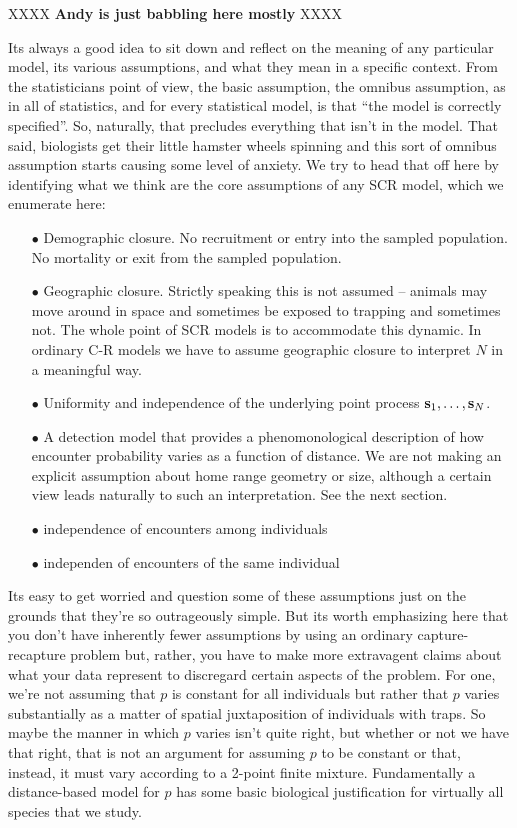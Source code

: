 XXXX {\bf Andy is just babbling here mostly} XXXX

Its always a good idea to sit down and reflect on the meaning of any
particular model, its various assumptions, and what they mean in a
specific context. 
From the statisticians point of view, 
the basic assumption, the omnibus assumption, as in all of statistics, and for every
statistical model, is  that ``the model is
correctly specified''. So, naturally, that precludes everything that
isn't in the model. That said, biologists get their little hamster
wheels spinning and this sort of omnibus assumption starts causing
some level of anxiety. We try to head that off here by identifying
what we think are the core assumptions of any SCR model, which we
enumerate here:

\begin{itemize} 
\item[$\bullet$] Demographic closure. 
 No recruitment or entry into the sampled population.
 No mortality or exit from the sampled population.
\item[$\bullet$] Geographic closure.
 Strictly speaking this is not assumed -- animals may move around in
 space and sometimes be exposed to trapping and sometimes not. The
 whole point of SCR models is to accommodate this dynamic. In ordinary
 C-R models we have to assume geographic closure to interpret $N$ in a
 meaningful way.
\item[$\bullet$] Uniformity and independence of the underlying point
  process ${\bf s}_{1},\ldots, {\bf s}_{N}$.
\item[$\bullet$] A detection model that provides a phenomonological
  description of how encounter probability varies as a function of distance.
 We are not making an explicit assumption about home range geometry or
 size, although a certain view leads naturally to such an
 interpretation. See the next section. 
\item[$\bullet$] independence of encounters among individuals
\item[$\bullet$] independen of encounters of the same individual
\end{itemize}

Its easy to get worried and question some of these assumptions just on
the grounds that they're so outrageously simple. But its worth
emphasizing here that you don't have inherently fewer assumptions by using an
ordinary capture-recapture problem but, rather, you have to make more
extravagent claims about what your data represent to discregard
certain aspects of the problem. 
For one, we're not assuming 
that $p$ is constant for all individuals but rather that $p$ varies
substantially as a matter of spatial juxtaposition of individuals with
traps. So maybe the manner in which $p$ varies isn't quite right, but
whether or not we have that right, that is not an argument for
assuming $p$ to be constant or that, instead, it must vary according
to a 2-point finite mixture.  Fundamentally a distance-based model for
$p$ has some basic biological justification for virtually all species
that we study. 


